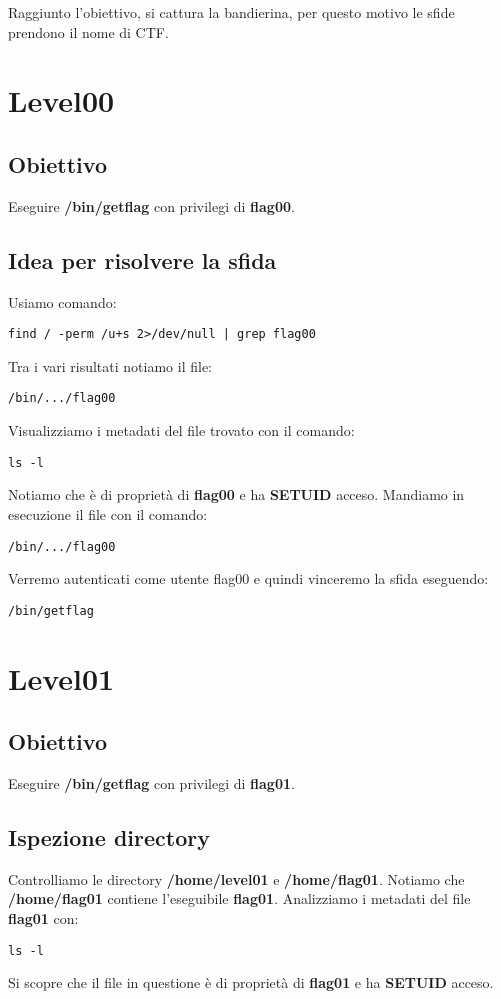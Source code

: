 Raggiunto l'obiettivo, si cattura la bandierina, per questo motivo le sfide prendono il nome di CTF.

\section{Level00}
\subsection{Obiettivo}
Eseguire \textbf{/bin/getflag} con privilegi di \textbf{flag00}.
\subsection{Idea per risolvere la sfida}
Usiamo comando: 
\begin{lstlisting}[style=bashstyle]
    find / -perm /u+s 2>/dev/null | grep flag00
\end{lstlisting}
Tra i vari risultati notiamo il file: 
\begin{lstlisting}[style=bashstyle]
    /bin/.../flag00
\end{lstlisting}
Visualizziamo i metadati del file trovato con il comando:
\begin{lstlisting}[style=bashstyle]
    ls -l
\end{lstlisting} 
Notiamo che è di proprietà di \textbf{flag00} e ha \textbf{SETUID} acceso.
Mandiamo in esecuzione il file con il comando: 
\begin{lstlisting}[style=bashstyle]
    /bin/.../flag00
\end{lstlisting} 
Verremo autenticati come utente flag00 e quindi vinceremo la sfida eseguendo:
\begin{lstlisting}[style=bashstyle]
    /bin/getflag
\end{lstlisting}


\section{Level01}
\subsection{Obiettivo}
Eseguire \textbf{/bin/getflag} con privilegi di \textbf{flag01}.
\subsection{Ispezione directory}
Controlliamo le directory \textbf{/home/level01} e \textbf{/home/flag01}. Notiamo che \textbf{/home/flag01} contiene l’eseguibile \textbf{flag01}.
Analizziamo i metadati del file \textbf{flag01} con: 
\begin{lstlisting}[style=bashstyle]
    ls -l
\end{lstlisting}
Si scopre che il file in questione è di proprietà di \textbf{flag01} e ha \textbf{SETUID} acceso.
